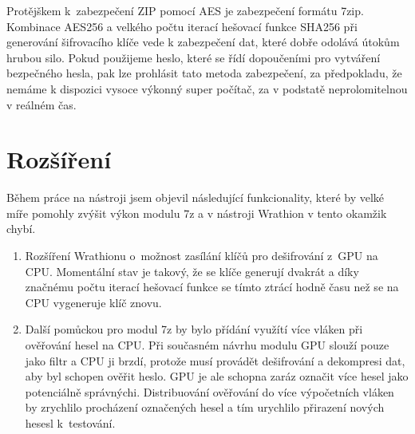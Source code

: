 Protějškem k~zabezpečení ZIP pomocí AES je zabezpečení formátu 7zip. Kombinace AES256 a velkého
počtu iterací hešovací funkce SHA256 při generování šifrovacího klíče vede k zabezpečení dat, které
dobře odolává útokům hrubou silo. Pokud použijeme heslo, které se řídí dopoučeními pro vytváření
bezpečného hesla, pak lze prohlásit tato metoda zabezpečení, za předpokladu, že nemáme k dispozici
vysoce výkonný super počítač, za v podstatě neprolomitelnou v reálném čas.


\section{Rozšíření}
Během práce na nástroji jsem objevil následující funkcionality, které by velké míře pomohly
zvýšit výkon modulu 7z a v nástroji Wrathion v tento okamžik chybí.
\begin{enumerate}
   \item Rozšíření Wrathionu o~možnost zasílání klíčů pro dešifrování z~GPU na CPU. Momentální
       stav je takový, že se klíče generují dvakrát a díky značnému počtu iterací hešovací funkce
       se tímto ztrácí hodně času než se na CPU vygeneruje klíč znovu.
    \item Další pomůckou pro modul 7z by bylo přídání využítí více vláken při ověřování hesel na
	CPU. Při současném návrhu modulu GPU slouží pouze jako filtr a CPU ji brzdí, protože musí
	provádět dešifrování a dekompresi dat, aby byl schopen ověřit heslo. GPU je ale schopna
	zaráz označit více hesel jako potenciálně správnýchi. Distribuování ověřování do
	více výpočetních vláken by zrychlilo procházení označených hesel a tím urychlilo
	přirazení nových hesesl k~testování.
\end{enumerate}


